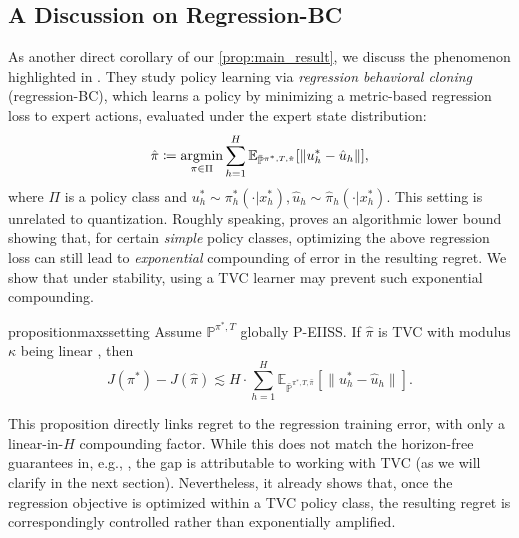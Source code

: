 \documentclass{article}
\begin{document}
\subsection{A Discussion on Regression-BC}
As another direct corollary of our \cref{prop:main_result},  we discuss the phenomenon highlighted in \citet{simchowitz2025pitfalls}. They study policy learning via \emph{regression behavioral cloning} (regression-BC), which learns a policy by minimizing a metric-based regression loss to expert actions, evaluated under the expert state distribution:
\begin{equation*}
    \hat \pi \coloneqq  \mathop{\mathrm{argmin}}_{\pi \in \Pi} \sum_{h=1}^H 
    \mathbb E_{\bar {\mathbb P}^{\pi^*, T, \hat \pi}}
    [\|u_h^*-\hat u_h\|],
\end{equation*}
where $\Pi$ is a policy class and $u_h^*\sim \pi_h^*(\cdot|x_h^*), \hat u_h\sim \hat \pi_h(\cdot|x_h^*)$. This setting is unrelated to quantization. Roughly speaking, \citet{simchowitz2025pitfalls} proves an algorithmic lower bound showing that, for certain \emph{simple} policy classes, optimizing the above regression loss can still lead to \emph{exponential} compounding of error in the resulting regret. We show that under stability, using a TVC learner may prevent such exponential compounding.

\begin{restatable}{proposition}{maxssetting}\label{prop:bounding_regret_with_l2}
Assume $\mathbb P^{\pi^*,T}$ globally P-EIISS. If $\hat \pi$ is TVC with modulus $\kappa$ being linear , then
\begin{equation*}
    J(\pi^*)-J(\hat \pi)
    \lesssim
    H\cdot \sum_{h=1}^H 
    \mathbb E_{\bar {\mathbb P}^{\pi^*, T, \hat \pi}}
    [\|u_h^*-\hat u_h\|].
\end{equation*}
\end{restatable}

This proposition directly links regret to the regression training error, with only a linear-in-$H$ compounding factor. While this does not match the horizon-free guarantees in, e.g., \citet{zhang2025imitation}, the gap is attributable to working with TVC (as we will clarify in the next section). Nevertheless, it already shows that, once the regression objective is optimized within a TVC policy class, the resulting regret is correspondingly controlled rather than exponentially amplified.
\end{document}

